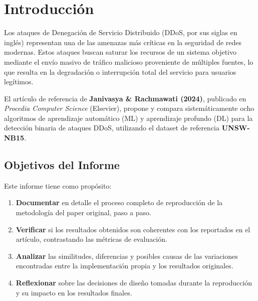 \documentclass[12pt,a4paper]{article}
\begin{document}
\tableofcontents
\newpage

\section{Introducción}

Los ataques de Denegación de Servicio Distribuido (DDoS, por sus siglas en inglés) representan
una de las amenazas más críticas en la seguridad de redes modernas. Estos ataques buscan saturar
los recursos de un sistema objetivo mediante el envío masivo de tráfico malicioso proveniente de
múltiples fuentes, lo que resulta en la degradación o interrupción total del servicio para usuarios legítimos.

El artículo de referencia de \textbf{Janivasya \& Rachmawati (2024)}, publicado en \textit{Procedia
Computer Science} (Elsevier), propone y compara sistemáticamente ocho algoritmos de aprendizaje
automático (ML) y aprendizaje profundo (DL) para la detección binaria de ataques DDoS, utilizando
el dataset de referencia \textbf{UNSW-NB15}.

\subsection{Objetivos del Informe}

Este informe tiene como propósito:

\begin{enumerate}[label=\textbf{\arabic*.}]
    \item \textbf{Documentar} en detalle el proceso completo de reproducción de la metodología
          del paper original, paso a paso.
    \item \textbf{Verificar} si los resultados obtenidos son coherentes con los reportados
          en el artículo, contrastando las métricas de evaluación.
    \item \textbf{Analizar} las similitudes, diferencias y posibles causas de las variaciones
          encontradas entre la implementación propia y los resultados originales.
    \item \textbf{Reflexionar} sobre las decisiones de diseño tomadas durante la reproducción
          y su impacto en los resultados finales.
\end{enumerate}
\end{document}
